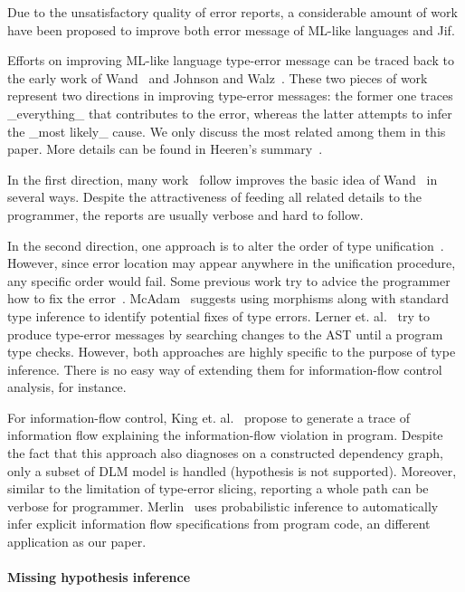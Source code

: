 Due to the unsatisfactory quality of error reports, a considerable
amount of work have been proposed to improve both error message of
ML-like languages and Jif.

Efforts on improving ML-like language type-error message can be traced back to
the early work of Wand~\cite{wand-errorfinding} and Johnson and
Walz~\cite{johnson-popl86}. These two pieces of work represent two directions
in improving type-error messages: the former one traces _everything_ that
contributes to the error, whereas the latter attempts to infer the _most
likely_ cause. We only discuss the most related among them in this paper. More
details can be found in Heeren's summary~\cite{heeren:thesis}.

In the first direction, many work~\cite{choppella95, haack:slicing,
tip:slicing} follow improves the basic idea of Wand~\cite{wand-errorfinding} in
several ways. Despite the attractiveness of feeding all related details to the
programmer, the reports are usually verbose and hard to follow.

In the second direction, one approach is to alter the order of type
unification~\cite{lee:toplas, mcadam:unification}. However, since error
location may appear anywhere in the unification procedure, any specific order
would fail. Some previous work try to advice the programmer how to fix the
error~\cite{mcadam:thesis, lerner:pldi07}. McAdam~\cite{mcadam:thesis} suggests
using morphisms along with standard type inference to identify potential fixes
of type errors. Lerner et. al.~\cite{lerner:pldi07} try to produce type-error
messages by searching changes to the AST until a program type checks. However,
both approaches are highly specific to the purpose of type inference. There is
no easy way of extending them for information-flow control analysis, for
instance.

For information-flow control, King et. al.~\cite{king:fse} propose to
generate a trace of information flow explaining the information-flow violation
in program. Despite the fact that this approach also diagnoses on a constructed
dependency graph, only a subset of DLM model is handled (hypothesis is not
supported). Moreover, similar to the limitation of type-error slicing,
reporting a whole path can be verbose for programmer.
Merlin~\cite{livshits:merlin} uses probabilistic inference to automatically
infer explicit information flow specifications from program code, an different
application as our paper.

\paragraph{Missing hypothesis inference}

